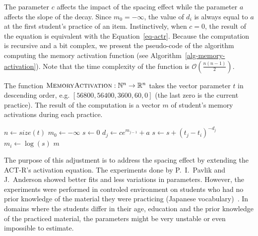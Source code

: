 The parameter $c$ affects the impact of the spacing effect while the parameter $a$ affects the slope of the decay. Since $m_0 = -\infty$, the value of $d_i$ is always equal to $a$ at the first student's practice of an item. Instinctively, when $c = 0$, the result of the equation is equivalent with the Equation~\ref{eq-actr}. Because the computation is recursive and a bit complex, we present the pseudo-code of the algorithm computing the memory activation function (see Algorithm~\ref{alg-memory-activation}). Note that the time complexity of the function is $\mathcal{O}\left(\frac{n(n-1)}{2}\right)$.

\begin{algorithm}
  \caption{The function $\textsc{MemoryActivation}: \mathbb{N}^n \rightarrow \mathbb{R}^n$ takes the vector parameter $t$ in descending order, e.g. $[56800, 56400, 3600, 60, 0]$ (the last zero is the current practice). The result of the computation is a vector $m$ of student's memory activations during each practice.}
  \label{alg-memory-activation}
  \begin{algorithmic}[1]
      \State $n \gets size(t)$
      \State $m_0 \gets -\infty$
        \State $s \gets 0$
          \State $d_j \gets ce^{m_{j-1}} + a$
          \State $s \gets s + (t_j - t_i)^{-d_j}$
        \EndFor
        \State $m_i \gets \log(s)$
      \EndFor
      \State \Return $m$
    \EndFunction
  \end{algorithmic}
\end{algorithm}

The purpose of this adjustment is to address the spacing effect by extending the ACT-R's activation equation. The experiments done by P.~I.~Pavlik and J.~Anderson showed better fits and less variations in parameters. However, the experiments were performed in controled environment on students who had no prior knowledge of the material they were practicing (Japanese vocabulary)~\cite{Pavlik2005}. In domains where the students differ in their age, education and the prior knowledge of the practiced material, the parameters might be very unstable or even impossible to estimate.

